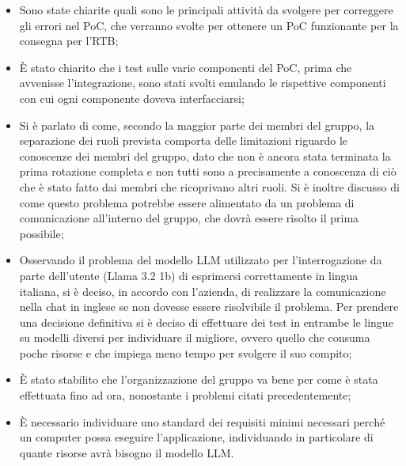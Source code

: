\begin{itemize}
\begin{itemize}
        \item Sono state chiarite quali sono le principali attività da svolgere per correggere gli errori nel PoC, che verranno svolte per ottenere un PoC funzionante per la consegna per l'RTB;
        \item \`E stato chiarito che i test sulle varie componenti del PoC, prima che avvenisse l'integrazione, sono stati svolti emulando le rispettive componenti con cui ogni componente doveva interfacciarsi;
        \item Si è parlato di come, secondo la maggior parte dei membri del gruppo, la separazione dei ruoli prevista comporta delle limitazioni riguardo le conoscenze dei membri del gruppo, dato che non è ancora stata terminata la prima rotazione completa e non tutti sono a precisamente a conoscenza di ciò che è stato fatto dai membri che ricoprivano altri ruoli. Si è inoltre discusso di come questo problema potrebbe essere alimentato da un problema di comunicazione all'interno del gruppo, che dovrà essere risolto il prima possibile;
        \item Osservando il problema del modello LLM utilizzato per l'interrogazione da parte dell'utente (Llama 3.2 1b) di esprimersi correttamente in lingua italiana, si è deciso, in accordo con l'azienda, di realizzare la comunicazione nella chat in inglese se non dovesse essere risolvibile il problema. Per prendere una decisione definitiva si è deciso di effettuare dei test in entrambe le lingue su modelli diversi per individuare il migliore, ovvero quello che consuma poche risorse e che impiega meno tempo per svolgere il suo compito;
        \item \`E stato stabilito che l'organizzazione del gruppo va bene per come è stata effettuata fino ad ora, nonostante i problemi citati precedentemente;
        \item  \`E necessario individuare uno standard dei requisiti minimi necessari perché un computer possa eseguire l'applicazione, individuando in particolare di quante risorse avrà bisogno il modello LLM.
    \end{itemize}
\end{itemize}